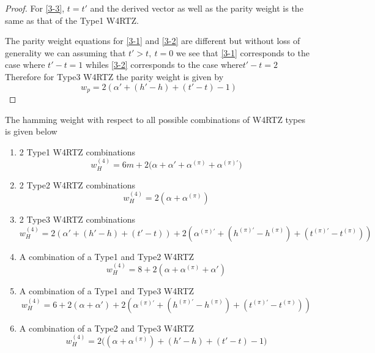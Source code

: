 \documentclass[11pt, oneside, dvipdfmx]{book}
\begin{document}
\begin{proof}
For \ref{3-3}, $t=t'$ and the derived vector as well as the parity weight is the same as that of the Type1 W4RTZ.

The parity weight equations for \ref{3-1} and \ref{3-2} are different but without loss of generality we can assuming  that $t'>t,~t=0$ we see that \ref{3-1} corresponds to the case where $t'-t=1$ whiles \ref{3-2} corresponds to the case where$t'-t=2$
Therefore for Type3 W4RTZ the parity weight is given by
\begin{equation}
w_p=2(\alpha' +(h'-h) +(t'-t)-1)
\end{equation}
\end{proof}

The hamming weight with respect to all possible combinations of W4RTZ types is given below

\begin{enumerate}
\item 2 Type1 W4RTZ combinations
\begin{equation}
w_H^{(4)} = 6m+2\Big(\alpha+\alpha' +\alpha^{(\pi)} +\alpha^{(\pi)'}\Big)
\end{equation}

\item 2 Type2 W4RTZ combinations
\begin{equation}
w_H^{(4)} = 2(\alpha + \alpha^{(\pi)})
\end{equation}

\item 2 Type3 W4RTZ combinations
\begin{equation}
w_H^{(4)} =2(\alpha' +(h'-h) +(t'-t)) + 2(\alpha^{(\pi)'} +(h^{(\pi)'}-h^{(\pi)}) 
+(t^{(\pi)'}-t^{(\pi)}))
\end{equation}

\item A combination of a Type1 and Type2 W4RTZ
\begin{equation}
w_H^{(4)} =8+2(\alpha + \alpha^{(\pi)} + \alpha')
\end{equation}

\item A combination of a Type1 and Type3 W4RTZ
\begin{equation}
w_H^{(4)} =6+2(\alpha + \alpha')+2(\alpha^{(\pi)'} +(h^{(\pi)'}-h^{(\pi)}) 
+(t^{(\pi)'}-t^{(\pi)}))
\end{equation}

\item A combination of a Type2 and Type3 W4RTZ
\begin{equation}
w_H^{(4)} =2\Big((\alpha + \alpha^{(\pi)})+(h'-h)+(t'-t) - 1\Big)
\end{equation}

\end{enumerate}






\end{document}
